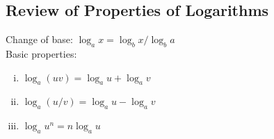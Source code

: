 \documentclass{article}
\begin{document}
		\subsection{Review of Properties of Logarithms}
			Change of base: $\log_a x = \log_b x/\log_b a$ \\
			Basic properties:
			\begin{enumerate}[(i)]
				\item $\log_a(uv) = \log_a u + \log_a v$
				\item $\log_a(u / v) = \log_a u - \log_a v$
				\item $\log_a u^n = n \log_a u$
				\end{enumerate}



	
\end{document}
